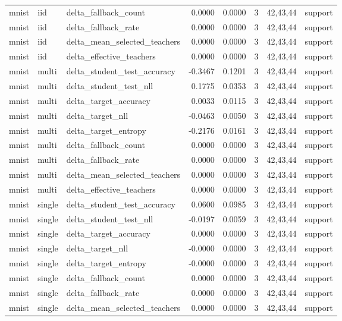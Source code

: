 \begin{tabular}{lllrrrll}
mnist & iid & delta\_fallback\_count & 0.0000 & 0.0000 & 3 & 42,43,44 & support \\
mnist & iid & delta\_fallback\_rate & 0.0000 & 0.0000 & 3 & 42,43,44 & support \\
mnist & iid & delta\_mean\_selected\_teachers & 0.0000 & 0.0000 & 3 & 42,43,44 & support \\
mnist & iid & delta\_effective\_teachers & 0.0000 & 0.0000 & 3 & 42,43,44 & support \\
mnist & multi & delta\_student\_test\_accuracy & -0.3467 & 0.1201 & 3 & 42,43,44 & support \\
mnist & multi & delta\_student\_test\_nll & 0.1775 & 0.0353 & 3 & 42,43,44 & support \\
mnist & multi & delta\_target\_accuracy & 0.0033 & 0.0115 & 3 & 42,43,44 & support \\
mnist & multi & delta\_target\_nll & -0.0463 & 0.0050 & 3 & 42,43,44 & support \\
mnist & multi & delta\_target\_entropy & -0.2176 & 0.0161 & 3 & 42,43,44 & support \\
mnist & multi & delta\_fallback\_count & 0.0000 & 0.0000 & 3 & 42,43,44 & support \\
mnist & multi & delta\_fallback\_rate & 0.0000 & 0.0000 & 3 & 42,43,44 & support \\
mnist & multi & delta\_mean\_selected\_teachers & 0.0000 & 0.0000 & 3 & 42,43,44 & support \\
mnist & multi & delta\_effective\_teachers & 0.0000 & 0.0000 & 3 & 42,43,44 & support \\
mnist & single & delta\_student\_test\_accuracy & 0.0600 & 0.0985 & 3 & 42,43,44 & support \\
mnist & single & delta\_student\_test\_nll & -0.0197 & 0.0059 & 3 & 42,43,44 & support \\
mnist & single & delta\_target\_accuracy & 0.0000 & 0.0000 & 3 & 42,43,44 & support \\
mnist & single & delta\_target\_nll & -0.0000 & 0.0000 & 3 & 42,43,44 & support \\
mnist & single & delta\_target\_entropy & -0.0000 & 0.0000 & 3 & 42,43,44 & support \\
mnist & single & delta\_fallback\_count & 0.0000 & 0.0000 & 3 & 42,43,44 & support \\
mnist & single & delta\_fallback\_rate & 0.0000 & 0.0000 & 3 & 42,43,44 & support \\
mnist & single & delta\_mean\_selected\_teachers & 0.0000 & 0.0000 & 3 & 42,43,44 & support \\

\end{tabular}
